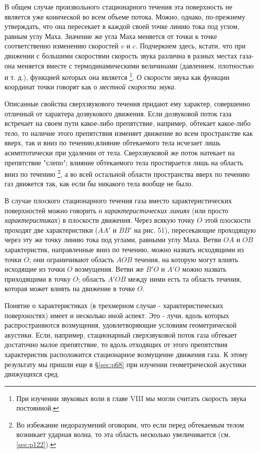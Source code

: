 В общем случае произвольного стационарного течения эта поверхность не является уже конической во всем объеме потока.
Можно, однако, по-прежнему утверждать, что она пересекает в каждой своей точке линию тока под углом, равным углу Маха.
Значение же угла Маха меняется от точки к точке соответственно изменению скоростей $v$ и $c$.
Подчеркнем здесь, кстати, что при движении с большими скоростями скорость звука различна в разных местах газа-она меняется вместе с термодинамическими величинами (давлением, плотностью и т. д.), функцией которых она является
\footnote{При изучении звуковых воли в главе VIII мы могли считать скорость звука постоянной.}.
О скорости звука как функции координат точки говорят как о \emph{местной скорости звука}.

Описанные свойства сверхзвукового течения придают ему характер, совершенно отличный от характера дозвукового движения.
Если дозвуковой поток газа встречает на своем пути какое-либо препятствие, например, обтекает какое-либо тело, то наличие этого препятствия изменяет движение во всем пространстве как вверх, так и вниз по течению,влияние обтекаемого тела исчезает лишь асимптотически при удалении от тела.
Сверхзвуковой же поток натекает на препятствие "слепо"; влияние обтекаемого тела простирается лишь на область вниз по течению
\footnote{Во избежание недоразумений оговорим, что если перед обтекаемым телом возникает ударная волна, то эта область несколько увеличивается (см. \ref{sec:p122}).},
а во всей остальной области пространства вверх по течению газ движется так, как если бы никакого тела вообще не было.

В случае плоского стационарного течения газа вместо характеристических поверхностей можно говорить о \emph{характеристических линиях} (или просто \emph{характеристиках}) в плоскости движения.
Через всякую точку $O$ этой плоскости проходят две характеристики ($AA'$ и $BB'$ на рис. 51), пересекающие проходящую через эту же точку линию тока под углами, равными углу Маха.
Ветви $OA$ и $OB$ характеристик, направленные вниз по течению, можно назвать исходящими из точки $O$; они ограничивают область $AOB$ течения, на которую могут влиять исходящие из точки $O$ возмущения.
Ветви же $B'O$ и $A'O$ можно назвать приходящими в точку $O$; область $A'OB$ между ними есть та область течения, которая может влиять на движение в точке $O$.

Понятие о характеристиках (в трехмерном случае - характеристических поверхностях) имеет и несколько иной аспект.
Это - лучи, вдоль которых распространяются возмущения, удовлетворяющие условиям геометрической акустики.
Если, например, стационарный сверхзвуковой поток газа обтекает достаточно малое препятствие, то вдоль отходящих от этого препятствия характеристик расположится стационарное возмущение движения газа.
К этому результату мы пришли еще в \S \ref{sec:p68} при изучении геометрической акустики движущихся сред.

